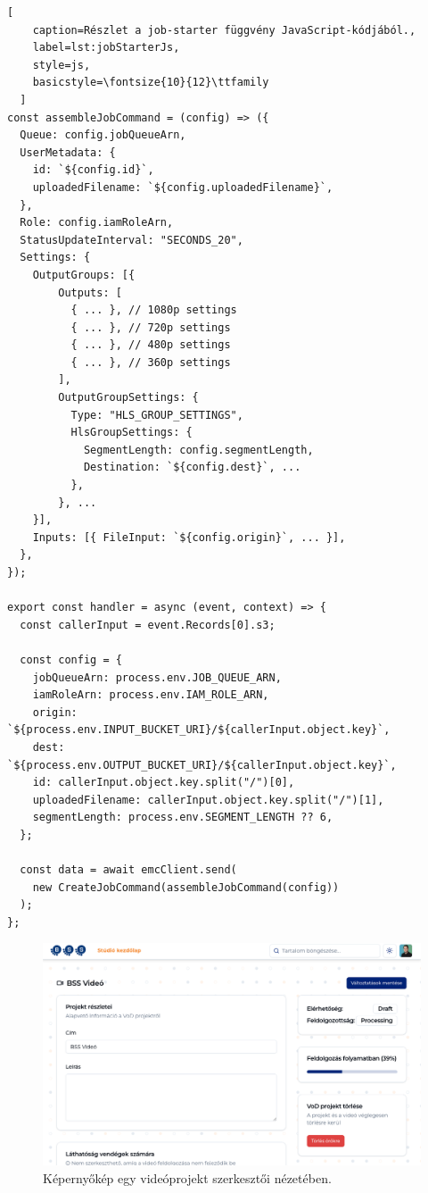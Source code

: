 \begin{minipage}{0.92\textwidth}
  \begin{lstlisting}[
    caption=Részlet a job-starter függvény JavaScript-kódjából.,
    label=lst:jobStarterJs,
    style=js,
    basicstyle=\fontsize{10}{12}\ttfamily
  ]
const assembleJobCommand = (config) => ({
  Queue: config.jobQueueArn,
  UserMetadata: {
    id: `${config.id}`,
    uploadedFilename: `${config.uploadedFilename}`,
  },
  Role: config.iamRoleArn,
  StatusUpdateInterval: "SECONDS_20",
  Settings: {
    OutputGroups: [{
        Outputs: [
          { ... }, // 1080p settings
          { ... }, // 720p settings
          { ... }, // 480p settings
          { ... }, // 360p settings
        ],
        OutputGroupSettings: {
          Type: "HLS_GROUP_SETTINGS",
          HlsGroupSettings: {
            SegmentLength: config.segmentLength, 
            Destination: `${config.dest}`, ...
          },
        }, ...
    }],
    Inputs: [{ FileInput: `${config.origin}`, ... }],
  },
});

export const handler = async (event, context) => {
  const callerInput = event.Records[0].s3;

  const config = {
    jobQueueArn: process.env.JOB_QUEUE_ARN,
    iamRoleArn: process.env.IAM_ROLE_ARN,
    origin: `${process.env.INPUT_BUCKET_URI}/${callerInput.object.key}`,
    dest: `${process.env.OUTPUT_BUCKET_URI}/${callerInput.object.key}`,
    id: callerInput.object.key.split("/")[0],
    uploadedFilename: callerInput.object.key.split("/")[1],
    segmentLength: process.env.SEGMENT_LENGTH ?? 6,
  };

  const data = await emcClient.send(
    new CreateJobCommand(assembleJobCommand(config))
  );
};
\end{lstlisting}
\end{minipage}

\begin{figure}[]
  \centering
  \includegraphics[width=150mm, keepaspectratio]{figures/processing.png}
  \caption{Képernyőkép egy videóprojekt szerkesztői nézetében.}
  \label{fig:processing}
\end{figure}

